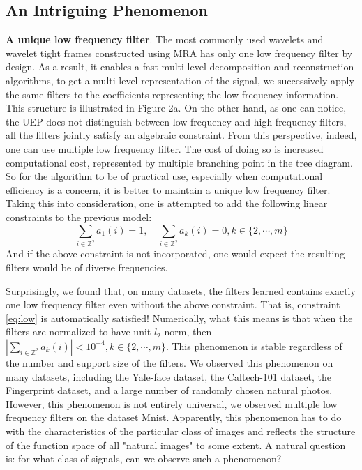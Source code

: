 \documentclass[a4paper]{article}
\begin{document}
\subsection{An Intriguing Phenomenon}
\textbf{A unique low frequency filter}. The most commonly used wavelets and wavelet tight frames constructed using MRA has only one low frequency filter by design. As a result, it enables a fast multi-level decomposition and reconstruction algorithms, to get a multi-level representation of the signal, we successively apply the same filters to the coefficients representing the low frequency information. This structure is illustrated in Figure 2a. On the other hand, as one can notice, the UEP does not distinguish between low frequency and high frequency filters, all the filters jointly satisfy an algebraic constraint. From this perspective, indeed, one can use multiple low frequency filter. The cost of doing so is increased computational cost, represented by multiple branching point in the tree diagram. So for the algorithm to be of practical use, especially when computational efficiency is a concern, it is better to maintain a unique low frequency filter. Taking this into consideration, one is attempted to add the following linear constraints to the previous model:
\begin{equation}
	\label{eq:low}
	\sum_{i\in\mathbb{Z}^2} a_1(i)=1,\quad \sum_{i\in \mathbb{Z}^2} a_k(i)=0, k\in\{2,\cdots,m\}
\end{equation}
And if the above constraint is not incorporated, one would expect the resulting filters would be of diverse frequencies.

Surprisingly, we found that, on many datasets, the filters learned contains exactly one low frequency filter even without the above constraint. That is, constraint \eqref{eq:low} is automatically satisfied!  Numerically, what this means is that when the filters are normalized to have unit $l_2$ norm, then $ |\sum_{i\in \mathbb{Z}^2} a_k(i)| < 10^{-4}, k\in\{2,\cdots,m\}$. This phenomenon is stable regardless of the number and support size of the filters. We observed this phenomenon on many datasets, including the Yale-face dataset, the Caltech-101 dataset, the Fingerprint dataset, and a large number of randomly chosen natural photos. However, this phenomenon is not entirely universal, we observed multiple low frequency filters on the dataset Mnist. Apparently, this phenomenon has to do with the characteristics of the particular class of images and reflects the structure of the function space of all "natural images" to some extent. A natural question is: for what class of signals, can we observe such a phenomenon?
\end{document}
